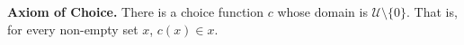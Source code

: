 \textbf{Axiom of Choice.} There is a choice function $c$ whose domain is $\mathcal{U} \setminus \{0\}$. That is, for every non-empty set $x$, $c(x) \in x$.
